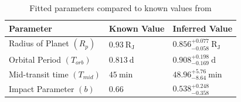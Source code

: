 \documentclass[12pt]{article}
\begin{document}
\begin{table}[h]
    \centering
    \renewcommand{\arraystretch}{1.2}

    \begin{tabular}{l|l|l}
    \hline
    \textbf{Parameter}   & \textbf{Known Value}    &        \textbf{Inferred Value}                      \\ 
    \hline 
    Radius of Planet $(R_{p})$     &      $ 0.93 \ \mathrm{R_J}$        &   $0.856^{+0.077}_{-0.058} \ \mathrm{R_J} $        \\  \hline
    Orbital Period $(T_{orb})$     &      $ 0.813 \ \mathrm{d}$          &  $ 0.908^{+0.198}_{-0.169} \ \mathrm{d}$ \\    \hline
   Mid-transit time $(T_{mid})$    &      $ 45 \ \mathrm{min} $  &  $48.96^{+5.76}_{-8.64} \ \mathrm{min} $         \\  \hline 
   Impact Parameter $(b)$    &      $ 0.66 $                &   $0.538^{+0.248}_{-0.358}$  \\  
    
    \end{tabular}
    \caption{Fitted parameters compared to known values from \cite{Hellier_2011}} 
    \label{result}
\end{table}


\newpage


\end{document}
